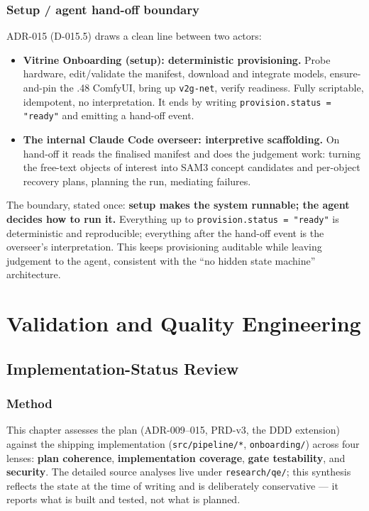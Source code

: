 \documentclass[a4paper,11pt]{report}
\newcommand{\code}[1]{\texttt{#1}}
\begin{document}
\section{Setup / agent hand-off boundary}
ADR-015 (D-015.5) draws a clean line between two actors:

\begin{itemize}
  \item \textbf{Vitrine Onboarding (setup): deterministic provisioning.} Probe hardware, edit/validate
  the manifest, download and integrate models, ensure-and-pin the .48 ComfyUI, bring up \code{v2g-net},
  verify readiness. Fully scriptable, idempotent, no interpretation. It ends by writing
  \code{provision.status = "ready"} and emitting a hand-off event.
  \item \textbf{The internal Claude Code overseer: interpretive scaffolding.} On hand-off it reads the
  finalised manifest and does the judgement work: turning the free-text objects of interest into SAM3
  concept candidates and per-object recovery plans, planning the run, mediating failures.
\end{itemize}

\begin{recommendation}
The boundary, stated once: \textbf{setup makes the system runnable; the agent decides how to run it.}
Everything up to \code{provision.status = "ready"} is deterministic and reproducible; everything after
the hand-off event is the overseer's interpretation. This keeps provisioning auditable while leaving
judgement to the agent, consistent with the ``no hidden state machine'' architecture.
\end{recommendation}

\part{Validation and Quality Engineering}

\chapter{Implementation-Status Review}

\section{Method}
This chapter assesses the plan (ADR-009--015, PRD-v3, the DDD extension) against the shipping
implementation (\code{src/pipeline/*}, \code{onboarding/}) across four lenses: \textbf{plan coherence},
\textbf{implementation coverage}, \textbf{gate testability}, and \textbf{security}. The detailed source
analyses live under \code{research/qe/}; this synthesis reflects the state at the time of writing and is
deliberately conservative — it reports what is built and tested, not what is planned.
\end{document}
